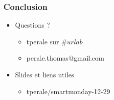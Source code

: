 \begin{frame}[t]
\frametitle{Conclusion}
\begin{itemize}
  \item Questions ?
  \begin{itemize}
    \item tperale sur $\#urlab$
    \item perale.thomas@gmail.com
  \end{itemize}
  \item Slides et liens utiles
  \begin{itemize}
    \item tperale/smartmonday-12-29
  \end{itemize}
\end{itemize}

\end{frame}
